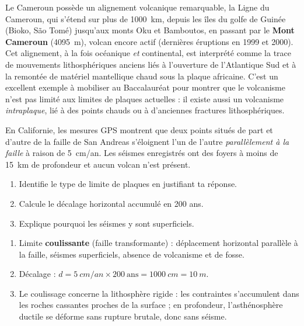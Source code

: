 \documentclass[11pt]{article}
\newcommand{\cle}[1]{{\popxbold\color{popdark}#1}}
\begin{document}
\begin{savaistu}
Le Cameroun possède un alignement volcanique remarquable, la \cle{Ligne du Cameroun}, qui s'étend sur plus de \SI{1000}{km}, depuis les îles du golfe de Guinée (Bioko, São Tomé) jusqu'aux monts Oku et Bamboutos, en passant par le \textbf{Mont Cameroun} (\SI{4095}{m}), volcan encore actif (dernières éruptions en 1999 et 2000). Cet alignement, à la fois océanique \emph{et} continental, est interprété comme la trace de mouvements lithosphériques anciens liés à l'ouverture de l'Atlantique Sud et à la remontée de matériel mantellique chaud sous la plaque africaine. C'est un excellent exemple à mobiliser au Baccalauréat pour montrer que le volcanisme n'est pas limité aux limites de plaques actuelles : il existe aussi un volcanisme \emph{intraplaque}, lié à des points chauds ou à d'anciennes fractures lithosphériques.
\end{savaistu}

\begin{exercice}
En Californie, les mesures GPS montrent que deux points situés de part et d'autre de la faille de San Andreas s'éloignent l'un de l'autre \emph{parallèlement à la faille} à raison de \SI{5}{cm/an}. Les séismes enregistrés ont des foyers à moins de \SI{15}{km} de profondeur et aucun volcan n'est présent.
\begin{enumerate}
\item Identifie le type de limite de plaques en justifiant ta réponse.
\item Calcule le décalage horizontal accumulé en 200 ans.
\item Explique pourquoi les séismes y sont superficiels.
\end{enumerate}
\end{exercice}

\begin{corrige}
\begin{enumerate}
\item Limite \textbf{coulissante} (faille transformante) : déplacement horizontal parallèle à la faille, séismes superficiels, absence de volcanisme et de fosse.
\item Décalage : $d = \SI{5}{cm/an} \times 200\ \text{ans} = \SI{1000}{cm} = \SI{10}{m}$.
\item Le coulissage concerne la lithosphère rigide : les contraintes s'accumulent dans les roches cassantes proches de la surface ; en profondeur, l'asthénosphère ductile se déforme sans rupture brutale, donc sans séisme.
\end{enumerate}
\end{corrige}
\end{document}
